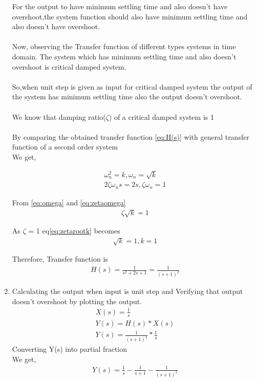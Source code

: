 \begin{enumerate}[label=\thesection.\arabic*.,ref=\thesection.\theenumi]
For the output to have minimum settling time and also doesn't have overshoot,the system function should also have minimum settling time and also doesn't have overshoot.\\
\\
Now, observing the Transfer function of different types systems in time domain. The system which has minimum settling time and also doesn't overshoot is critical damped system.\\
\\
So,when unit step is given as input for critical damped system the output of the system has minimum settling time also the output doesn't overshoot.\\
\\
We know that damping ratio(\(\zeta \)) of a critical damped system is 1\\
\\
By comparing the obtained transfer function \eqref{eq:H(s)} with general transfer function of a second order system\\
We get,

\begin{align}
\label{eq:omega}
\omega_n^2 = k,\omega_n = \sqrt{k}\\
\label{eq:zetaomega}
2\zeta\omega_ns = 2s,\zeta\omega_n = 1
\end{align}

From \eqref{eq:omega} and \eqref{eq:zetaomega} \\
\begin{align}
\zeta\sqrt{k} = 1
\label{eq:zetarootk}
\end{align}

As \(\zeta\) = 1  eq\eqref{eq:zetarootk} becomes 
\begin{align}
\sqrt{k} = 1,k = 1
\end{align}

Therefore, Transfer function is 
\begin{align}
H(s) = \frac{1}{s^2+2s+1} = \frac{1}{(s+1)^2}
\end{align}

\item Calculating the output when input is unit step and Verifying that output doesn't overshoot by plotting the output.\\
\solution 
\begin{align}
X(s) = \frac{1}{s}\\
Y(s) = H(s)*X(s)\\
Y(s) = \frac{1}{(s+1)^2}*\frac{1}{s}
\end{align}
Converting Y(s) into partial fraction\\
We get,
\begin{align}
Y(s) = \frac{1}{s}-\frac{1}{s+1}-\frac{1}{(s+1)^2}
\label{Y(s)}
\end{align}


\end{enumerate}
